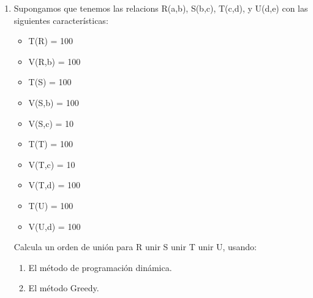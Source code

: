 \documentclass{templateNote}
\begin{document}
\begin{enumerate}
    \item Supongamos que tenemos las relacions R(a,b), S(b,c), T(c,d), y U(d,e) con las siguientes características:
    \begin{itemize}
        \item T(R) = 100
        \item V(R,b) = 100
        \item T(S) = 100
        \item V(S,b) = 100
        \item V(S,c) = 10
        \item T(T) = 100
        \item V(T,c) = 10
        \item V(T,d) = 100
        \item T(U) = 100
        \item V(U,d) = 100
    \end{itemize}
    Calcula un orden de unión para R unir S unir T unir U, usando:
    \begin{enumerate}
        \item El método de programación dinámica.
        \item El método Greedy.
    \end{enumerate}
\end{enumerate}
\end{document}
